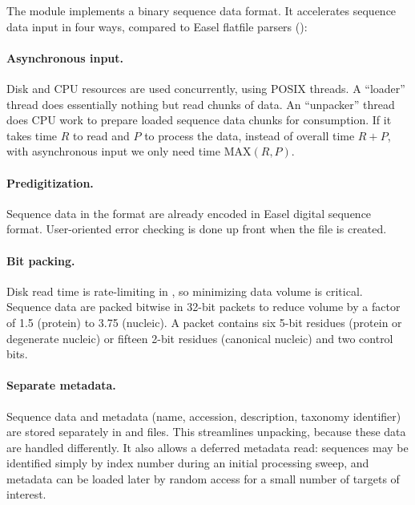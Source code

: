 The  module implements a binary sequence data
format. It accelerates sequence data input in four ways, compared to
Easel flatfile parsers ():

\paragraph{Asynchronous input.}
   Disk and CPU resources are used concurrently, using POSIX threads.
   A ``loader'' thread does essentially nothing but read chunks of
   data.  An ``unpacker'' thread does CPU work to prepare loaded
   sequence data chunks for consumption. If it takes time $R$ to read
   and $P$ to process the data, instead of overall time $R+P$, with
   asynchronous input we only need time $\mathrm{MAX}(R,P)$.

\paragraph{Predigitization.} 
  Sequence data in the  format are already encoded in
  Easel digital sequence format.  User-oriented error checking is done
  up front when the  file is created.
                                                                     
\paragraph{Bit packing.} 
  Disk read time is rate-limiting in , so minimizing
  data volume is critical.  Sequence data are packed bitwise
  in 32-bit packets to reduce volume by a factor of 1.5 (protein) to
  3.75 (nucleic). A packet contains six 5-bit residues (protein or
  degenerate nucleic) or fifteen 2-bit residues (canonical nucleic) and two
  control bits.
                                                                     
\paragraph{Separate metadata.} 
  Sequence data and metadata (name, accession, description, taxonomy
  identifier) are stored separately in  and 
  files. This streamlines unpacking, because these data are handled
  differently.  It also allows a deferred metadata read: sequences may
  be identified simply by index number during an initial processing
  sweep, and metadata can be loaded later by random access for a small
  number of targets of interest.



